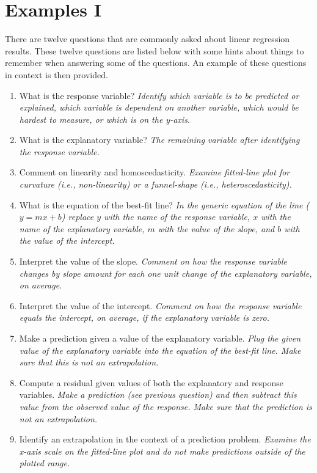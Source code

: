 \documentclass[10pt,openany]{book}\usepackage[]{graphicx}\usepackage[]{color}
\begin{document}
\section{Examples I}
There are twelve questions that are commonly asked about linear regression results. These twelve questions are listed below with some hints about things to remember when answering some of the questions. An example of these questions in context is then provided.

\begin{enumerate}
  \item What is the response variable?  \textit{Identify which variable is to be predicted or explained, which variable is dependent on another variable, which would be hardest to measure, or which is on the y-axis.}
  \item What is the explanatory variable?  \textit{The remaining variable after identifying the response variable.}
  \item Comment on linearity and homoscedasticity. \textit{Examine fitted-line plot for curvature (i.e., non-linearity) or a funnel-shape (i.e., heteroscedasticity).}
  \item What is the equation of the best-fit line?  \textit{In the generic equation of the line ($y=mx+b$) replace $y$ with the name of the response variable, $x$ with the name of the explanatory variable, $m$ with the value of the slope, and $b$ with the value of the intercept.}
  \item Interpret the value of the slope. \textit{Comment on how the response variable changes by slope amount for each one unit change of the explanatory variable, on average.}
  \item Interpret the value of the intercept. \textit{Comment on how the response variable equals the intercept, on average, if the explanatory variable is zero.}
  \item Make a prediction given a value of the explanatory variable. \textit{Plug the given value of the explanatory variable into the equation of the best-fit line. Make sure that this is not an extrapolation.}
  \item Compute a residual given values of both the explanatory and response variables. \textit{Make a prediction (see previous question) and then subtract this value from the observed value of the response. Make sure that the prediction is not an extrapolation.}
  \item Identify an extrapolation in the context of a prediction problem. \textit{Examine the x-axis scale on the fitted-line plot and do not make predictions outside of the plotted range.}

\end{enumerate}
\end{document}
